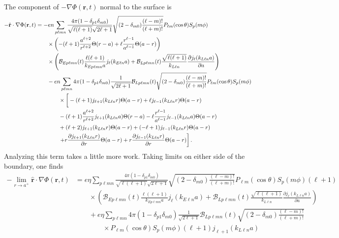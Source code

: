 \documentclass{article}
\begin{document}
The component of $-\nabla\Phi(\mathbf{r},t)$ normal to the surface is
\begin{equation}
\begin{split}
-\hat{\mathbf{r}}\cdot\nabla\Phi(\mathbf{r},t) &= -en\sum_{p\ell mn}\frac{4\pi(1 - \delta_{p1}\delta_{m0})}{\sqrt{\ell(\ell + 1)}\sqrt{2\ell + 1}}\sqrt{(2 - \delta_{m0})\frac{(\ell - m)!}{(\ell + m)!}}P_{\ell m}(\cos\theta)S_p(m\phi)\\
&\qquad\times\left(-(\ell + 1)\frac{a^{\ell + 2}}{r^{\ell + 2}}\Theta(r - a) + \ell\frac{r^{\ell - 1}}{a^{\ell - 1}}\Theta(a - r)\right)\\
&\qquad\times\left(\mathcal{B}_{Ep\ell mn}(t)\frac{\ell(\ell + 1)}{k_{Ep\ell mn}a}j_\ell(k_{E\ell n}a) + \mathcal{B}_{Lp\ell mn}(t)\frac{\sqrt{\ell(\ell + 1)}}{k_{L\ell n}}\frac{\partial j_{\ell}(k_{L\ell n}a)}{\partial a}\right)\\
&\qquad - en\sum_{p\ell mn}4\pi(1 - \delta_{p1}\delta_{m0})\frac{1}{\sqrt{2\ell + 1}}\mathcal{B}_{Lp\ell mn}(t)\sqrt{(2 - \delta_{m0})\frac{(\ell - m)!}{(\ell + m)!}}P_{\ell m}(\cos\theta)S_p(m\phi)\\
&\qquad\qquad\times\left[ \vphantom{\frac{\partial}{\partial r}} -(\ell + 1)j_{\ell + 1}(k_{L\ell n}r)\Theta(a - r) + \ell j_{\ell - 1}(k_{L\ell n}r)\Theta(a - r)\right.\\
&\qquad\qquad - (\ell + 1)\frac{a^{\ell + 2}}{r^{\ell + 2}}j_{\ell + 1}(k_{L\ell n}a)\Theta(r - a) - \ell\frac{r^{\ell - 1}}{a^{\ell - 1}}j_{\ell - 1}(k_{L\ell n}a)\Theta(a - r)\\
&\qquad\qquad + (\ell + 2)j_{\ell + 1}(k_{L\ell n}r)\Theta(a - r) + (-\ell + 1)j_{\ell - 1}(k_{L\ell n}r)\Theta(a - r)\\
&\qquad\qquad\left. + r\frac{\partial j_{\ell + 1}(k_{L\ell n}r)}{\partial r}\Theta(a - r) + r\frac{\partial j_{\ell - 1}(k_{L\ell n}r)}{\partial r}\Theta(a - r)\right].
\end{split}
\end{equation}
Analyzing this term takes a little more work. Taking limits on either side of the boundary, one finds
\begin{equation}
\begin{split}
-\lim_{r\to a^+}\hat{\mathbf{r}}\cdot\nabla\Phi(\mathbf{r},t) &= e\eta\sum_{p\ell mn}\frac{4\pi(1 - \delta_{p1}\delta_{m0})}{\sqrt{\ell(\ell + 1)}\sqrt{2\ell + 1}}\sqrt{(2 - \delta_{m0})\frac{(\ell - m)!}{(\ell + m)!}}P_{\ell m}(\cos\theta)S_p(m\phi)(\ell + 1)\\
&\qquad\times\left(\mathcal{B}_{Ep\ell mn}(t)\frac{\ell(\ell + 1)}{k_{Ep\ell mn}a}j_\ell(k_{E\ell n}a) + \mathcal{B}_{Lp\ell mn}(t)\frac{\sqrt{\ell(\ell + 1)}}{k_{L\ell n}}\frac{\partial j_{\ell}(k_{L\ell n}a)}{\partial a}\right)\\
&\qquad + e\eta\sum_{p\ell mn}4\pi(1 - \delta_{p1}\delta_{m0})\frac{1}{\sqrt{2\ell + 1}}\mathcal{B}_{Lp\ell mn}(t)\sqrt{(2 - \delta_{m0})\frac{(\ell - m)!}{(\ell + m)!}}\\
&\qquad\qquad\times P_{\ell m}(\cos\theta)S_p(m\phi)(\ell + 1)j_{\ell + 1}(k_{L\ell n}a)
\end{split}
\end{equation}
\end{document}
